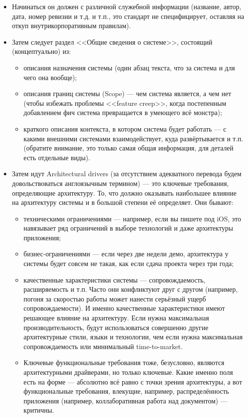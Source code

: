 \documentclass{../mcstext}
\begin{document}
\begin{itemize}
    \item Начинаться он должен с различной служебной информации (название, автор, дата, номер ревизии и т.д. и т.п., это стандарт не специфицирует, оставляя на откуп внутрикорпоративным правилам).
    \item Затем следует раздел <<Общие сведения о системе>>, состоящий (концептуально) из:
        \begin{itemize}
            \item описания назначения системы (один абзац текста, что за система и для чего она вообще);
            \item описания границ системы (Scope) --- чем система является, а чем нет (чтобы избежать проблемы <<feature creep>>, когда постепенным добавлением фич система превращается в умеющего всё монстра);
            \item краткого описания контекста, в котором система будет работать --- с какими внешними системами взаимодействует, куда развёртывается и т.п. (обратите внимание, это только самая общая информация, для деталей есть отдельные виды).
        \end{itemize}
    \item Затем идут Architectural drivers (за отсутствием адекватного перевода будем довольствоваться англоязычным термином) --- это ключевые требования, определяющие архитектуру. То, что должно оказывать наибольшее влияние на архитектуру системы и в большой степени её определяет. Они бывают:
        \begin{itemize}
            \item техническими ограничениями --- например, если вы пишете под iOS, это навязывает ряд ограничений в выборе технологий и даже архитектуры приложения;
            \item бизнес-ограничениями --- если через две недели демо, архитектура у системы будет совсем не такая, как если сдача проекта через три года;
            \item качественные характеристики системы --- сопровождаемость, расширяемость и т.п. Часто они конфликтуют друг с другом (например, погоня за скоростью работы может нанести серьёзный ущерб сопровождаемости). И именно качественные характеристики имеют решающее влияние на архитектуру. Если нужна максимальная производительность, будут использоваться совершенно другие архитектурные стили, языки и технологии, чем если нужна максимальная сопровождаемость или минимальный time-to-market.
            \item Ключевые функциональные требования тоже, безусловно, являются архитектурными драйверами, но только ключевые. Какие именно поля есть на форме --- абсолютно всё равно с точки зрения архитектуры, а вот функциональные требования, влекущие, например, распределённость приложения (например, коллаборативная работа над документом) --- критичны.

\end{itemize}
\end{itemize}
\end{document}
